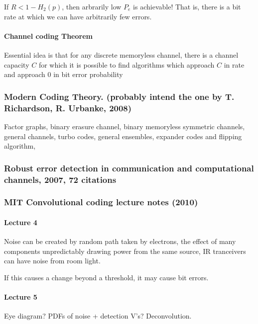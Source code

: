 \documentclass{article}
\begin{document}
If $R < 1 - H_2(p)$, then arbrarily low $P_e$ is achievable! That is, there is a bit rate at which we can have arbitrarily few errors.

\paragraph{Channel coding Theorem}

Essential idea is that for any discrete memoryless channel, there is a channel capacity $C$ for which  it is possible to find algorithms which approach $C$ in rate and approach 0 in bit error probability


\subsubsection{Modern Coding Theory. (probably intend the one by T. Richardson, R. Urbanke, 2008)}

Factor graphs, binary erasure channel, binary memoryless symmetric channels, general channels, turbo codes, general ensembles, expander codes and flipping algorithm,

\subsubsection{Robust error detection in communication and computational channels, 2007, 72 citations}

\subsubsection{MIT Convolutional coding lecture notes (2010)}

\paragraph{Lecture 4}

Noise can be created by random path taken by electrons, the effect of many components unpredictably drawing power from the same source, IR tranceivers can have noise from room light.

If this causes a change beyond a threshold, it may cause bit errors.

\paragraph{Lecture 5}

Eye diagram? PDFs of noise + detection V's? Deconvolution.
\end{document}
